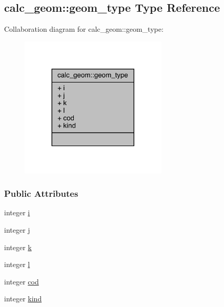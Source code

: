 \hypertarget{structcalc__geom_1_1geom__type}{\subsection{calc\-\_\-geom\-:\-:geom\-\_\-type Type Reference}
\label{structcalc__geom_1_1geom__type}
}


Collaboration diagram for calc\-\_\-geom\-:\-:geom\-\_\-type\-:
\nopagebreak
\begin{figure}[H]
\begin{center}
\leavevmode
\includegraphics[width=200pt]{structcalc__geom_1_1geom__type__coll__graph}
\end{center}
\end{figure}
\subsubsection*{Public Attributes}
\begin{DoxyCompactItemize}
\item 
integer \hyperlink{structcalc__geom_1_1geom__type_a99cb923e9c7e2e6b4d898f11d0c2a939}{i}
\item 
integer \hyperlink{structcalc__geom_1_1geom__type_a00a06ffff0b97a474c87ff18a84f4caf}{j}
\item 
integer \hyperlink{structcalc__geom_1_1geom__type_abc65c629be65ea1c0a14943b76db8e92}{k}
\item 
integer \hyperlink{structcalc__geom_1_1geom__type_a7cc1284b731630012ebecb15813c47a0}{l}
\item 
integer \hyperlink{structcalc__geom_1_1geom__type_ab28959bb210c06582b3e9edbe330c734}{cod}
\item 
integer \hyperlink{structcalc__geom_1_1geom__type_aec4da2a1ff4b31aebb3359747951a1dd}{kind}
\end{DoxyCompactItemize}


